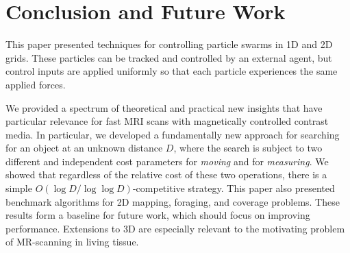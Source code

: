 \section{Conclusion and Future Work}\label{sec:conclusion}

This paper presented techniques for controlling particle swarms in 1D and 2D grids.
These particles can be tracked and controlled by an external agent, but control inputs are applied uniformly so that each particle experiences the same applied forces. 

We provided a spectrum of theoretical and practical new insights  that have particular relevance for fast MRI scans with magnetically controlled contrast media.
In particular, we developed a fundamentally new approach 
for searching for an object at an unknown distance $D$, where the search is 
subject to two different and independent cost parameters
for {\em moving} and for {\em measuring}. We showed that regardless of the relative cost of these two operations,
there is a simple $O(\log D/\log\log D)$-competitive strategy.
This paper also presented benchmark algorithms for 2D mapping, foraging, and coverage problems.
These results form a baseline for future work, which should focus on improving performance. 
Extensions to 3D are especially relevant to the motivating problem of MR-scanning in living tissue.